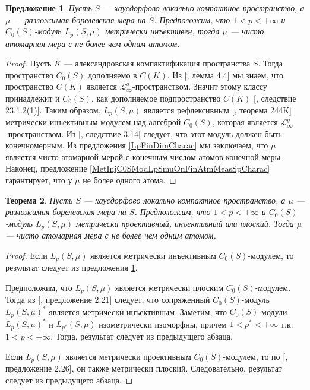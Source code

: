 \documentclass[12pt]{article}
\newtheorem{theorem}{Теорема}[section]
\newtheorem{proposition}[theorem]{Предложение}
\begin{document}
\begin{proposition}\label{MetInjC0SModLpSmuCharac}
    Пусть $S$ --- хаусдорфово локально компактное пространство, а $\mu$ --- 
    разложимая борелевская мера на $S$. Предположим, что $1 < p < +\infty$ 
    и $C_0(S)$-модуль $L_p(S,\mu)$ метрически инъективен, тогда $\mu$ --- чисто 
    атомарная мера с не более чем одним атомом.
\end{proposition}
\begin{proof} 
    Пусть $K$ --- александровская компактификация пространства $S$. 
    Тогда пространство $C_0(S)$ дополняемо в $C(K)$. 
    Из [\cite{DefFloTensNorOpId}, лемма 4.4] мы знаем, что пространство $C(K)$ 
    является $\mathscr{L}_\infty^g$-пространством. Значит этому классу 
    принадлежит и $C_0(S)$, как дополняемое подпространство $C(K)$ 
    [\cite{DefFloTensNorOpId}, следствие 23.1.2(1)]. 
    Таким образом, $L_p(S,\mu)$ является рефлексивным 
    [\cite{FremMeasTh2}, теорема 244K] метрически инъективным модулем над 
    алгеброй $C_0(S)$, которая является $\mathscr{L}_\infty^g$-пространством. 
    Из [\cite{NemGeomProjInjFlatBanMod}, следствие 3.14] следует, что этот 
    модуль должен быть конечномерным. Из предложения \ref{LpFinDimCharac} мы 
    заключаем, что $\mu$ является чисто атомарной мерой с конечным числом атомов 
    конечной меры. Наконец, 
    предложение \ref{MetInjC0SModLpSmuOnFinAtmMeasSpCharac} гарантирует, что 
    у $\mu$ не более одного атома.
\end{proof}

\begin{theorem}\label{MetInjPlotjFlatC0SModLpSmuCharac}
    Пусть $S$ --- хаусдорфово локально компактное пространство, а $\mu$ --- 
    разложимая борелевская мера на $S$. Предположим, что $1 < p < +\infty$ 
    и $C_0(S)$-модуль $L_p(S,\mu)$ метрически проективный, инъективный или 
    плоский. Тогда $\mu$ --- чисто атомарная мера с не более чем одним атомом.
\end{theorem}
\begin{proof} 
    Если $L_p(S,\mu)$ является метрически инъективным $C_0(S)$-модулем, то 
    результат следует из 
    предложения \ref{MetInjC0SModLpSmuCharac}. 
    
    Предположим, что $L_p(S,\mu)$ является метрически плоским $C_0(S)$-модулем. 
    Тогда из [\cite{NemGeomProjInjFlatBanMod}, предложение 2.21] следует, что
    сопряженный $C_0(S)$-модуль $L_p(S,\mu)^*$ является метрически инъективным. 
    Заметим, что $C_0(S)$-модули $L_p(S,\mu)^*$ и $L_{p^*}(S,\mu)$ изометрически 
    изоморфны, причем $1 < p^* < +\infty$ т.к. $1 < p < +\infty$. Тогда, 
    результат следует из предыдущего абзаца.
    
    Если $L_p(S,\mu)$ является метрически проективным $C_0(S)$-модулем, то 
    по [\cite{NemGeomProjInjFlatBanMod}, предложение 2.26], он также метрически 
    плоский. Следовательно, результат следует из предыдущего абзаца.
\end{proof}
\end{document}
